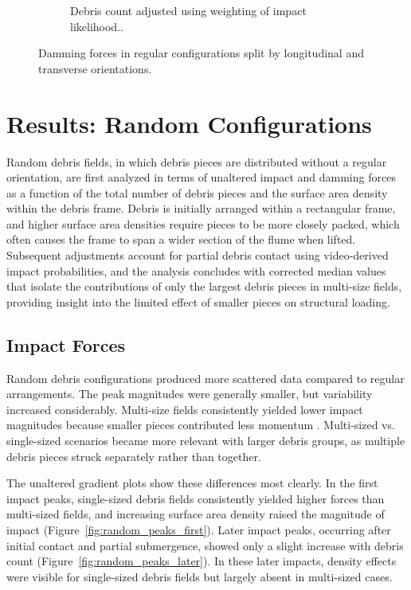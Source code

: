 \documentclass{article}
\begin{document}
\begin{figure}[htbp]
\begin{subfigure}[t]{0.9\textwidth}
        \caption{Debris count adjusted using weighting of impact likelihood..}
        \label{fig:damming_regular_remap}
    \end{subfigure}
    \caption{Damming forces  in regular configurations split by longitudinal and transverse orientations.}
    \label{fig:damming_regular_split}
\end{figure}

\section{Results: Random Configurations}
Random debris fields, in which debris pieces are distributed without a regular orientation, are first analyzed in terms of unaltered impact and damming forces as a function of the total number of debris pieces and the surface area density within the debris frame. Debris is initially arranged within a rectangular frame, and higher surface area densities require pieces to be more closely packed, which often causes the frame to span a wider section of the flume when lifted. Subsequent adjustments account for partial debris contact using video-derived impact probabilities, and the analysis concludes with corrected median values that isolate the contributions of only the largest debris pieces in multi-size fields, providing insight into the limited effect of smaller pieces on structural loading.

\subsection{Impact Forces} 
Random debris configurations produced more scattered data compared to regular arrangements. The peak magnitudes were generally smaller, but variability increased considerably. Multi-size fields consistently yielded lower impact magnitudes because
smaller pieces contributed less momentum . Multi-sized vs. single-sized scenarios became more relevant with larger debris groups, as multiple debris pieces struck separately rather than together.

The unaltered gradient plots show these differences most clearly. In the first impact peaks, single-sized debris fields consistently yielded higher forces than multi-sized fields, and increasing surface area density raised the magnitude of impact (Figure~\ref{fig:random_peaks_first}). Later impact peaks, occurring after initial contact and partial submergence, showed only a slight increase with debris count (Figure~\ref{fig:random_peaks_later}). In these later impacts, density effects were visible for single-sized debris fields but largely absent in multi-sized cases.
\end{document}
